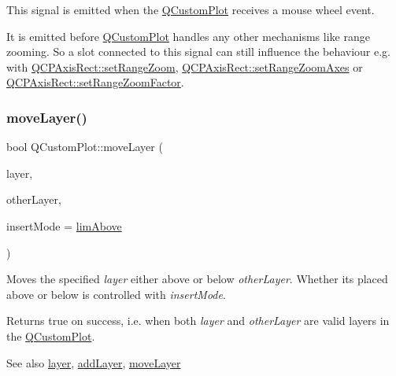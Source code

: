 This signal is emitted when the \hyperlink{class_q_custom_plot}{Q\+Custom\+Plot} receives a mouse wheel event.

It is emitted before \hyperlink{class_q_custom_plot}{Q\+Custom\+Plot} handles any other mechanisms like range zooming. So a slot connected to this signal can still influence the behaviour e.\+g. with \hyperlink{class_q_c_p_axis_rect_a7960a9d222f1c31d558b064b60f86a31}{Q\+C\+P\+Axis\+Rect\+::set\+Range\+Zoom}, \hyperlink{class_q_c_p_axis_rect_a9442cca2aa358405f39a64d51eca13d2}{Q\+C\+P\+Axis\+Rect\+::set\+Range\+Zoom\+Axes} or \hyperlink{class_q_c_p_axis_rect_a895d7ac745ea614e04056244b3c138ac}{Q\+C\+P\+Axis\+Rect\+::set\+Range\+Zoom\+Factor}. \hypertarget{class_q_custom_plot_ae896140beff19424e9e9e02d6e331104}{}\label{class_q_custom_plot_ae896140beff19424e9e9e02d6e331104} 
\subsubsection{\texorpdfstring{move\+Layer()}{moveLayer()}}
{\footnotesize\ttfamily bool Q\+Custom\+Plot\+::move\+Layer (\begin{DoxyParamCaption}\item[{\hyperlink{class_q_c_p_layer}{Q\+C\+P\+Layer} $\ast$}]{layer,  }\item[{\hyperlink{class_q_c_p_layer}{Q\+C\+P\+Layer} $\ast$}]{other\+Layer,  }\item[{\hyperlink{class_q_custom_plot_a75a8afbe6ef333b1f3d47abb25b9add7}{Q\+Custom\+Plot\+::\+Layer\+Insert\+Mode}}]{insert\+Mode = {\ttfamily \hyperlink{class_q_custom_plot_a75a8afbe6ef333b1f3d47abb25b9add7a062b0b7825650b432a713c0df6742d41}{lim\+Above}} }\end{DoxyParamCaption})}

Moves the specified {\itshape layer} either above or below {\itshape other\+Layer}. Whether it\textquotesingle{}s placed above or below is controlled with {\itshape insert\+Mode}.

Returns true on success, i.\+e. when both {\itshape layer} and {\itshape other\+Layer} are valid layers in the \hyperlink{class_q_custom_plot}{Q\+Custom\+Plot}.

\begin{DoxySeeAlso}{See also}
\hyperlink{class_q_custom_plot_a0a96244e7773b242ef23c32b7bdfb159}{layer}, \hyperlink{class_q_custom_plot_ad5255393df078448bb6ac83fa5db5f52}{add\+Layer}, \hyperlink{class_q_custom_plot_ae896140beff19424e9e9e02d6e331104}{move\+Layer} 
\end{DoxySeeAlso}
\hypertarget{class_q_custom_plot_af1a1f1f571237deb7c2bd34a5e9f018f}{}\label{class_q_custom_plot_af1a1f1f571237deb7c2bd34a5e9f018f} 
